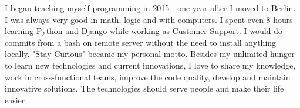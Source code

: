\documentclass[letterpaper]{deedy-resume} %
\begin{document}




I began teaching myself programming in 2015 - one year after I moved to Berlin. I was always very good in math, logic and with computers. I spent even 8 hours learning Python and Django while working as Customer Support. I would do commits from a bash on remote server without the need to install anything locally. "Stay Curious" became my personal motto. Besides my unlimited hunger to learn new technologies and current innovations, I love to share my knowledge, work in cross-functional teams, improve the code quality, develop and maintain innovative solutions. The technologies should serve people and make their life easier.

\sectionspace %


\end{document}
